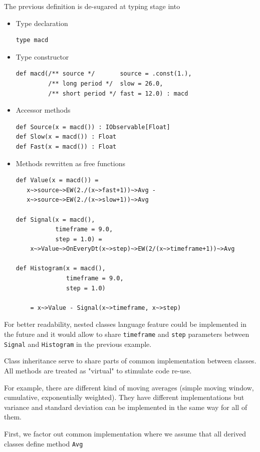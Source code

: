 \documentclass[a4paper,11pt]{article}
\begin{document}
The previous definition is de-sugared at typing stage into

\begin{itemize}
\item Type declaration
\begin{verbatim}
type macd
\end{verbatim}
\item Type constructor 
\begin{verbatim}
def macd(/** source */       source = .const(1.),
         /** long period */  slow = 26.0,
         /** short period */ fast = 12.0) : macd
\end{verbatim}
\item Accessor methods
\begin{verbatim}
def Source(x = macd()) : IObservable[Float]
def Slow(x = macd()) : Float
def Fast(x = macd()) : Float
\end{verbatim}
\item Methods rewritten as free functions
\begin{verbatim}
def Value(x = macd()) =
   x~>source~>EW(2./(x~>fast+1))~>Avg -
   x~>source~>EW(2./(x~>slow+1))~>Avg

def Signal(x = macd(),        
           timeframe = 9.0,
           step = 1.0) = 
    x~>Value~>OnEveryDt(x~>step)~>EW(2/(x~>timeframe+1))~>Avg

def Histogram(x = macd(),
              timeframe = 9.0,
              step = 1.0)

    = x~>Value - Signal(x~>timeframe, x~>step)
\end{verbatim}
\end{itemize}

For better readability, nested classes language feature could be implemented in the future and it would allow to share \texttt{timeframe} and \texttt{step} parameters between \texttt{Signal} and \texttt{Histogram} in the previous example.

Class inheritance serve to share parts of common implementation between classes. All methods are treated as "virtual" to stimulate code re-use.

For example, there are different kind of moving averages (simple moving window, cumulative, exponentially weighted). They have different implementations but variance and standard deviation can be implemented in the same way for all of them.

First, we factor out common implementation where we assume that all derived classes define method \texttt{Avg}
\end{document}

